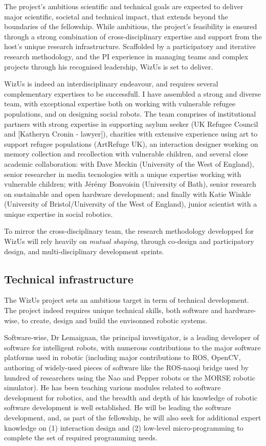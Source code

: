 \documentclass[11pt]{report}
\newcommand{\project}{WizUs\xspace}
\begin{document}
The project's ambitious scientific and technical goals are expected to deliver
major scientific, societal and technical impact, that extends beyond the
boundaries of the fellowship. While ambitious, the project's feasibility is
ensured through a strong combination of cross-disciplinary expertise and
support from the host's unique research infrastructure. Scaffolded by a
participatory and iterative research methodology, and the PI experience in
managing teams and complex projects through his recognised leadership, \project
is set to deliver.

\project is indeed an interdisciplinary endeavour, and requires several
complementary expertises to be successfull. I have assembled a strong and
diverse team, with exceptional expertise both on working with vulnerable refugee
populations, and on designing social robots. The team comprises of institutional
partners with strong expertise in supporting asylum seeker (UK Refugee Council
and [Katheryn Cronin - lawyer]), charities with extensive experience using art
to support refugee populations (ArtRefuge UK), an interaction designer working
on memory collection and recollection with vulnerable children, and several
close academic collaboration: with Dave Meckin (University of the West of
England), senior researcher in media tecnologies with a unique expertise working
with vulnerable children; with Jérémy Bonvoisin (University of Bath), senior
research on sustainable and open hardware development; and finally with Katie
Winkle (University of Bristol/University of the West of England), junior
scientist with a unique expertise in social robotics.

To mirror the cross-disciplinary team, the research methodology developped for
\project will rely heavily on \emph{mutual shaping}, through co-design and
participatory design, and multi-disciplinary development sprints.

\subsection{Technical infrastructure}

The \project project sets an ambitious target in term of technical development.
The project indeed requires unique technical skills, both software and
hardware-wise, to create, design and build the envisonned robotic systems.

Software-wise, Dr Lemaignan, the principal investigator, is a leading
developer of software for intelligent robots, with numerous contributions to
the major software platforms used in robotic (including major contributions to
ROS, OpenCV, authoring of widely-used pieces of software like the ROS-naoqi
bridge used by hundred of researchers using the Nao and Pepper robots or the
MORSE robotic simulator). He has been teaching various modules related to
software development for robotics, and the breadth and depth of his knowledge of
robotic software development is well established. He will be leading the
software development, and, as part of the fellowship, he will also seek for
additional expert knowledge on (1) interaction design and (2) low-level
micro-programming to complete the set of required programming needs.
\end{document}
